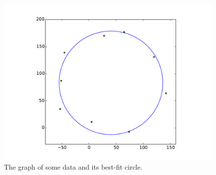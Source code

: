 \begin{figure}[H]
    \includegraphics[width=\textwidth]{figures/circle.pdf}
    \caption{The graph of some data and its best-fit circle.}
    \label{fig:circle}
\end{figure}

